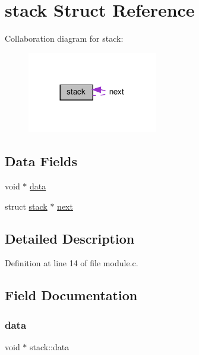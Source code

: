\hypertarget{structstack}{}\section{stack Struct Reference}
\label{structstack}


Collaboration diagram for stack\+:
\nopagebreak
\begin{figure}[H]
\begin{center}
\leavevmode
\includegraphics[width=161pt]{d2/d28/structstack__coll__graph}
\end{center}
\end{figure}
\subsection*{Data Fields}
\begin{DoxyCompactItemize}
\item 
void $\ast$ \hyperlink{structstack_a1352a254d010fe6a3def6f6936bf4932}{data}
\item 
struct \hyperlink{structstack}{stack} $\ast$ \hyperlink{structstack_a1ae95552c67c85b2a6e73d61e8006bf7}{next}
\end{DoxyCompactItemize}


\subsection{Detailed Description}


Definition at line 14 of file module.\+c.



\subsection{Field Documentation}
\mbox{\label{structstack_a1352a254d010fe6a3def6f6936bf4932}} 
\subsubsection{\texorpdfstring{data}{data}}
{\footnotesize\ttfamily void $\ast$ stack\+::data}



